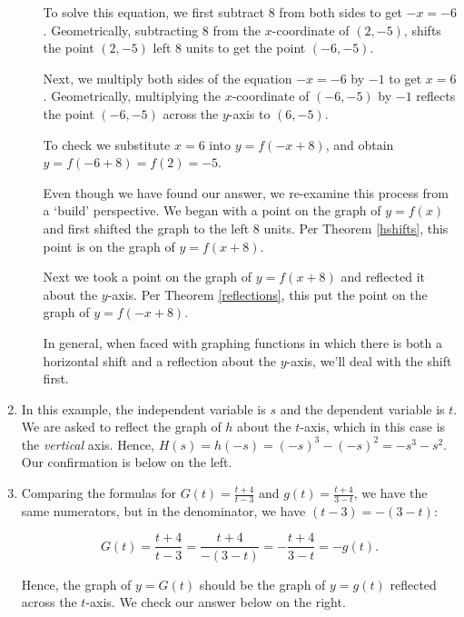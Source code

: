 \begin{ex}
\begin{enumerate}
\begin{enumerate}
 \smallskip
 
 To solve this equation, we first subtract $8$ from both sides to get $-x = -6$.   Geometrically,  subtracting $8$ from the $x$-coordinate of $(2,-5)$, shifts the point $(2,-5)$  left $8$ units to get the point $(-6,-5)$.   
 
 \smallskip
 
 Next, we multiply both sides of the equation $-x = -6$ by $-1$ to get $x = 6$.  Geometrically, multiplying the $x$-coordinate of $(-6,-5)$ by $-1$ reflects the point $(-6,-5)$  across the $y$-axis to  $(6,-5)$.   
 
 \smallskip
 
 To check we substitute $x=6$ into $y = f(-x+8)$,  and obtain $y = f(-6+8) = f(2) = -5$. 
 
 \smallskip
 
 Even though we have found our answer, we re-examine this process from a `build' perspective.  We began with a point on the graph of $y=f(x)$ and first shifted the graph to the left $8$ units.   Per Theorem \ref{hshifts}, this point is on the graph of $y=f(x+8)$.  
 
 \smallskip
 
 Next we took a point on the graph of $y=f(x+8)$ and reflected it about the $y$-axis.  Per Theorem \ref{reflections}, this put the point on the graph of $y=f(-x+8)$. 
 
 \smallskip
 
  In general, when faced with graphing functions in which there is both a horizontal shift and a reflection about the $y$-axis, we'll deal with the shift first.
  
  \end{enumerate}
 
  \item  In this example, the independent variable is $s$ and the dependent variable is $t$.   We are asked to reflect the graph of $h$ about the $t$-axis, which in this case is the \textit{vertical} axis.  Hence,  $H(s) = h(-s) = (-s)^3-(-s)^2 = -s^3-s^2$. Our confirmation is below on the left.
 
 \item Comparing the formulas for $G(t) = \frac{t+4}{t-3}$ and $g(t) =\frac{t+4}{3-t}$, we have the same numerators, but in the denominator, we have $(t-3) = -(3-t)$:  
 
 \[G(t) =  \dfrac{t+4}{t-3} = \dfrac{t+4}{-(3-t)} = - \dfrac{t+4}{3-t} = -g(t). \]
 
 Hence, the graph of $y=G(t)$ should be the graph of $y=g(t)$ reflected across the $t$-axis. We check our answer below on the right.
 

\end{enumerate}
\end{ex}

